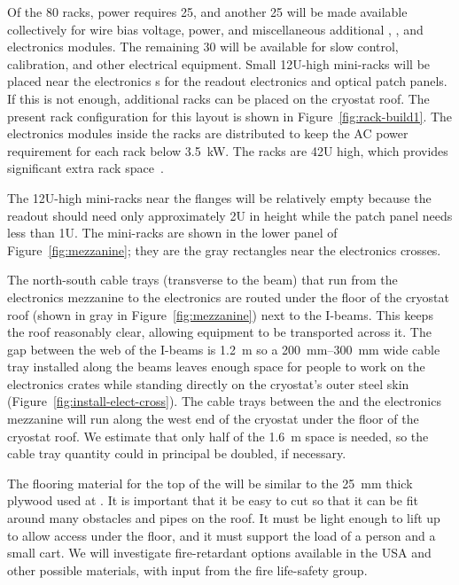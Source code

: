 Of the 80 racks,   power requires \num{25}, and another \num{25} will be made available collectively for   wire bias voltage,  power, and miscellaneous additional , , and   electronics modules. 
The remaining 30 will be available for slow control, calibration, and other electrical equipment. 
Small 12U-high mini-racks will  be placed near the electronics \fdth{}s for the  readout electronics and optical patch panels. If this is not enough, additional racks can be placed on the cryostat roof. The present rack configuration for this layout is shown in Figure~\ref{fig:rack-build1}. 
The electronics modules inside the racks are distributed to keep the AC power requirement for each rack below \SI{3.5}{kW}. 
The racks are 42U high, which provides significant extra rack space~\cite{bib:docdb4499}.  


The 12U-high mini-racks near the \fdth flanges will be relatively empty because the  readout should need only approximately 2U in height while the  patch panel needs less than 1U. The mini-racks are shown in the lower panel of Figure~\ref{fig:mezzanine}; 
they are the gray rectangles near the electronics crosses.

The north-south cable trays (transverse to the beam) that run from the electronics mezzanine to the electronics \fdth are routed under the floor of the cryostat roof (shown in gray in Figure~\ref{fig:mezzanine}) next to the 
I-beams. 
This keeps the roof reasonably clear, allowing equipment to be transported across it. 
The gap between the web of the I-beams is \SI{1.2}{m} so 
a \SIrange{200}{300}{mm} wide cable tray installed along the beams 
leaves enough space for people to work on the electronics crates while standing directly on the cryostat's outer steel skin (Figure~\ref{fig:install-elect-cross}). 
The cable trays between the  and the electronics mezzanine will run along the west end of the cryostat under the floor of the cryostat roof. 
We estimate that only half of the \SI{1.6}{m} space is needed, so the cable tray quantity could in principal be doubled, if necessary. 

The flooring material for the top of the 
will be similar to the \SI{25}{mm} thick plywood used at . 
It is important that it be easy to cut so that it can be fit around many obstacles and pipes on the roof. 
It must be light enough to lift up to allow access under the floor, and it must support the load of a person and a small cart. 
We will investigate fire-retardant options available in the USA and other possible materials, with input from the  fire life-safety group. 

